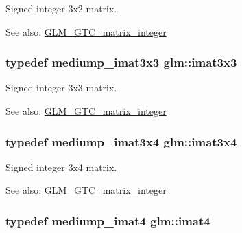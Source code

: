Signed integer 3x2 matrix. \begin{Desc}
\item[See also:]\hyperlink{group__gtc__matrix__integer}{GLM\_\-GTC\_\-matrix\_\-integer} \end{Desc}
\hypertarget{group__gtc__matrix__integer_geff9ef8f56cccc828d6b897923e75402}{
\subsubsection[imat3x3]{\setlength{\rightskip}{0pt plus 5cm}typedef mediump\_\-imat3x3 {\bf glm::imat3x3}}}
\label{group__gtc__matrix__integer_geff9ef8f56cccc828d6b897923e75402}


Signed integer 3x3 matrix. \begin{Desc}
\item[See also:]\hyperlink{group__gtc__matrix__integer}{GLM\_\-GTC\_\-matrix\_\-integer} \end{Desc}
\hypertarget{group__gtc__matrix__integer_gee5507e6cbbdd05841a0c174e60dd036}{
\subsubsection[imat3x4]{\setlength{\rightskip}{0pt plus 5cm}typedef mediump\_\-imat3x4 {\bf glm::imat3x4}}}
\label{group__gtc__matrix__integer_gee5507e6cbbdd05841a0c174e60dd036}


Signed integer 3x4 matrix. \begin{Desc}
\item[See also:]\hyperlink{group__gtc__matrix__integer}{GLM\_\-GTC\_\-matrix\_\-integer} \end{Desc}
\hypertarget{group__gtc__matrix__integer_g40fc5c5e0b07543497aa1c314891544a}{
\subsubsection[imat4]{\setlength{\rightskip}{0pt plus 5cm}typedef mediump\_\-imat4 {\bf glm::imat4}}}
\label{group__gtc__matrix__integer_g40fc5c5e0b07543497aa1c314891544a}


